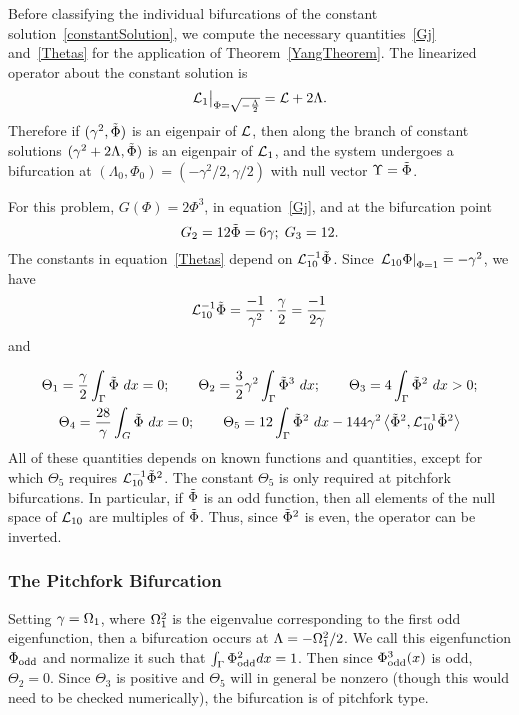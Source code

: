 \documentclass{article}
\numberwithin{equation}{section}
\numberwithin{figure}{section}
\begin{document}
Before classifying the individual bifurcations of the constant solution~\eqref{constantSolution}, we compute the necessary quantities~\eqref{Gj} and~\eqref{Thetas} for the application of Theorem~\ref{YangTheorem}. The linearized operator about the constant solution is 
$$
\bigl. \mathcal{L}_{1} \bigr \rvert_{\Phi=\sqrt{-\frac{\Lambda}{2}}}
=
\mathcal{L}+ 2 \Lambda.
$$
Therefore if $(\gamma^2,\tilde{\Phi})$ is an eigenpair of $\mathcal{L}$, then along the branch of constant solutions $(\gamma^2+2\Lambda,\tilde{\Phi})$ is an eigenpair of $\mathcal{L}_1$, and the system undergoes a bifurcation at $(\Lambda_0,\Phi_0)= \left(-\gamma^2/2,\gamma/2\right)$ with null vector $\Upsilon=\tilde{\Phi}$.

For this problem, $G(\Phi) = 2 \Phi^3$, in equation~\eqref{Gj}, and at the bifurcation point
$$
G_2 = 12 \tilde{\Phi} = 6 \gamma; \; G_3 = 12.
$$
The constants in equation~\eqref{Thetas} depend on $\mathcal{L}_{10}^{-1} \tilde{\Phi}$. Since $\left. \mathcal{L}_{10}\Phi \right|_{\Phi=1} = -\gamma^2$, we have 
$$
\mathcal{L}_{10}^{-1} \tilde{\Phi} = \frac{-1}{\gamma^2} \cdot \frac{\gamma}{2} = \frac{-1}{2 \gamma}
$$ 
and

\begin{equation*}
\begin{gathered}
\Theta_1 = \frac{\gamma}{2} \int_{\Gamma} \tilde{\Phi} \ dx = 0; \qquad
\Theta_2 = \frac{3}{2}\gamma^2 \int_{\Gamma} \tilde{\Phi}^3 \ dx ; \qquad
\Theta_3 = 4 \int_{\Gamma} \tilde{\Phi}^2 \ dx > 0; \\
\Theta_4 = \frac{28}{\gamma} \int_G \tilde{\Phi} \ dx = 0; \qquad
\Theta_5 = 12 \int_{\Gamma} \tilde{\Phi}^2 \ dx - 144 \gamma^2 \left\langle \tilde{\Phi}^2, \mathcal{L}_{10}^{-1} \tilde{\Phi}^2 \right\rangle
\end{gathered}
\end{equation*}
All of these quantities depends on known functions and quantities, except for which $\Theta_5$ requires $\mathcal{L}_{10}^{-1} \tilde{\Phi}^2$. The constant $\Theta_5$ is only required at pitchfork bifurcations. 
In particular, if $\tilde{\Phi}$ is an odd function, then all elements of the null space of $\mathcal{L}_{10}$ are multiples of $\tilde{\Phi}$. Thus, since $\tilde{\Phi}^2$ is even, the operator can be inverted.



\subsubsection{The Pitchfork Bifurcation}
\label{sec:pitchfork}
Setting $\gamma=\Omega_1$, where $\Omega_1^2$ is the eigenvalue corresponding to the first odd eigenfunction, then a bifurcation occurs at $\Lambda = -\Omega_1^2/2$. We call this eigenfunction $\Phi_{\rm odd}$ and normalize it such that $\int_{\Gamma} \Phi_{\rm odd}^2 dx = 1$. Then since $\Phi_{\rm odd}^3(x)$ is odd, $\Theta_2=0$. Since $\Theta_3$ is positive and $\Theta_5$ will in general be nonzero (though this would need to be checked numerically), the bifurcation is of pitchfork type. 
\end{document}
